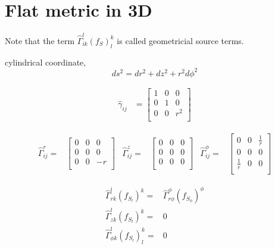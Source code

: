 \section{Flat metric in 3D}

Note that the term $ \hat{\Gamma}^l_{ik}(f_S)^k_l $ is called geometricial source terms.

cylindrical coordinate,
\begin{equation}
 ds^2 = dr^2 + dz^2 + r^2 d\phi^2 
\end{equation}

\begin{align}
	\hat{\gamma}_{ij} &= \begin{bmatrix}
		1 & 0 & 0 \\
		0 & 1 & 0 \\
		0 & 0 & r^2 \\
       	\end{bmatrix}
\end{align}

\begin{align}
	\hat{\Gamma}^r_{ij} = &\begin{bmatrix}
		0 & 0 & 0 \\
		0 & 0 & 0 \\
		0 & 0 & -r \\
       	\end{bmatrix} &
	\hat{\Gamma}^z_{ij} = &\begin{bmatrix}
		0 & 0 & 0 \\
		0 & 0 & 0 \\
		0 & 0 & 0 \\
       	\end{bmatrix} &
	\hat{\Gamma}^\phi_{ij} = &\begin{bmatrix}
		0  & 0& \frac{1}{r} \\
		0 & 0 & 0 \\
		\frac{1}{r} & 0 & 0 \\
       	\end{bmatrix}
\end{align}

\begin{align}
\hat{\Gamma}^l_{rk}(f_{S_l})^k =& \hat{\Gamma}^\phi_{r\phi}(f_{S_\phi})^\phi \\ %
\hat{\Gamma}^l_{zk}(f_{S_l})^k  =& 0  \\
\hat{\Gamma}^l_{\phi k }(f_{S_l})^k_l =& 0
\end{align}

